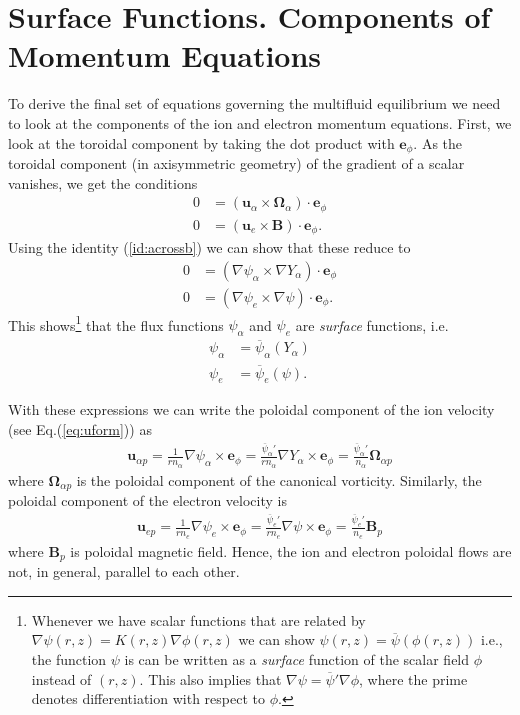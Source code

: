 \documentclass[11pt, reqno]{amsart}
\newcommand{\eqr}[1]{Eq.\thinspace(#1)}
\newcommand{\mvec}[1]{\mathbf{#1}}
\newcommand{\eep}{\mvec{e}_\phi}
\theoremstyle{definition}
\begin{document}
\section{Surface Functions. Components of Momentum Equations}

To derive the final set of equations governing the multifluid
equilibrium we need to look at the components of the ion and electron
momentum equations. First, we look at the toroidal component by taking
the dot product with $\eep$. As the toroidal component (in
axisymmetric geometry) of the gradient of a scalar vanishes, we get
the conditions
\begin{align}
  0 &= (\mvec{u}_\alpha\times \mvec{\Omega}_\alpha)\cdot\eep \\
  0 &= (\mvec{u}_e\times \mvec{B})\cdot\eep.
\end{align}
Using the identity (\ref{id:acrossb}) we can show that these reduce to
\begin{align}
  0 &= (\nabla \psi_\alpha \times \nabla Y_\alpha)\cdot\eep \\
  0 &= (\nabla \psi_e \times \nabla \psi)\cdot\eep.
\end{align}
This shows\footnote{Whenever we have scalar functions that are related
  by $\nabla \psi(r,z) = K(r,z) \nabla \phi(r,z)$ we can show
  $\psi(r,z) = \overline{\psi}(\phi(r,z))$ i.e., the function $\psi$
  is can be written as a \emph{surface} function of the scalar field
  $\phi$ instead of $(r,z)$. This also implies that $\nabla \psi =
  \overline{\psi}' \nabla\phi$, where the prime denotes
  differentiation with respect to $\phi$.} that the flux functions
$\psi_\alpha$ and $\psi_e$ are \emph{surface} functions, i.e.
\begin{align}
  \psi_\alpha &= \overline{\psi}_\alpha(Y_\alpha) \\
  \psi_e &= \overline{\psi}_e(\psi).
\end{align}

With these expressions we can write the poloidal component of the ion
velocity (see \eqr{\ref{eq:uform}}) as
\begin{align}
  \mvec{u}_{\alpha p} 
  = \frac{1}{r n_\alpha}\nabla\psi_\alpha \times\eep
  = \frac{\overline{\psi}_\alpha'}{r n_\alpha}\nabla Y_\alpha \times\eep
  = \frac{\overline{\psi}_\alpha'}{n_\alpha}\mvec{\Omega}_{\alpha p}
\end{align}
where $\mvec{\Omega}_{\alpha p}$ is the poloidal component of the
canonical vorticity. Similarly, the poloidal component of the electron
velocity is
\begin{align}
  \mvec{u}_{e p} 
  = \frac{1}{r n_e}\nabla\psi_e \times\eep
  = \frac{\overline{\psi}_e'}{r n_e}\nabla \psi \times\eep
  = \frac{\overline{\psi}_e'}{n_e}\mvec{B}_{p}
\end{align}
where $\mvec{B}_{p}$ is poloidal magnetic field. Hence, the ion and
electron poloidal flows are not, in general, parallel to each other.
\end{document}
